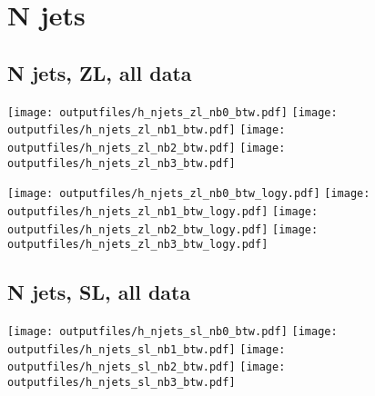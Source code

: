 \documentclass[11pt]{article}
\begin{document}







  \clearpage
   \section{ N jets }

    \subsection{ N jets, ZL, all data}

    \noindent
     \texttt{[image: outputfiles/h\_njets\_zl\_nb0\_btw.pdf]}
     \texttt{[image: outputfiles/h\_njets\_zl\_nb1\_btw.pdf]}
     \texttt{[image: outputfiles/h\_njets\_zl\_nb2\_btw.pdf]}
     \texttt{[image: outputfiles/h\_njets\_zl\_nb3\_btw.pdf]}

    \noindent
     \texttt{[image: outputfiles/h\_njets\_zl\_nb0\_btw\_logy.pdf]}
     \texttt{[image: outputfiles/h\_njets\_zl\_nb1\_btw\_logy.pdf]}
     \texttt{[image: outputfiles/h\_njets\_zl\_nb2\_btw\_logy.pdf]}
     \texttt{[image: outputfiles/h\_njets\_zl\_nb3\_btw\_logy.pdf]}

   \clearpage

    \subsection{ N jets, SL, all data}

    \noindent
     \texttt{[image: outputfiles/h\_njets\_sl\_nb0\_btw.pdf]}
     \texttt{[image: outputfiles/h\_njets\_sl\_nb1\_btw.pdf]}
     \texttt{[image: outputfiles/h\_njets\_sl\_nb2\_btw.pdf]}
     \texttt{[image: outputfiles/h\_njets\_sl\_nb3\_btw.pdf]}
\end{document}
